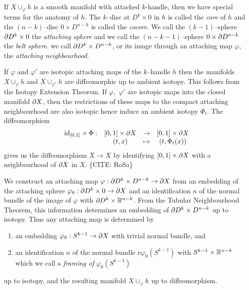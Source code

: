 If $X\cup_\varphi h$ is a smooth manifold with attached $k$-handle, then we have special terms for the anatomy of $h$.
The $k$--disc at $D^k\times 0$ in $h$ is called the \emph{core} of $h$ and the $(n-k)$--disc $0 \times D^{n-k}$ is called the \emph{cocore}.
We call the $(k-1)$--sphere $\partial D^k \times 0$ the \emph{attaching sphere} and we call the $(n-k-1)$--sphere $ 0 \times \partial D^{n-k}$ the \emph{belt sphere}.
we call $\partial D^k\times D^{n-k}$, or its image through an attaching map $\varphi$, the \emph{attaching neighbourhood}.

\begin{rmk}
	If $\varphi$ and $\varphi'$ are isotopic attaching maps of the $k$--handle $h$ then the manifolds $X\cup_\varphi h$ and $X\cup_{\varphi'} h$ are diffeomorphic up to ambient isotopy.
	This follows from the Isotopy Extension Theorem.
	If $\varphi,$ $\varphi'$ are isotopic maps into the closed manifold $\partial X$, then the restrictions of these maps to the compact attaching neighbourhood are also isotopic hence induce an ambient isotopy $\Phi_t$.
	The diffeomorphism
	\[
		\begin{array}{cccc}
			\textrm{id}_{[0,1]}\times\Phi: & [0,1]\times \partial X & \to & [0,1]\times\partial X \\
									 & (t,x) & \mapsto & (t,\Phi_t(x))
		\end{array}
	\]
	gives us the diffeomorphism $X\to X$ by identifying $[0,1]\times\partial X$ with a neighbourhood of $\partial X$ in $X$. \{CITE: RoSa\}
	
	We construct an attaching map $\varphi:\partial D^k\times D^{n-k}\to\partial X$ from an embedding of the attaching sphere $\varphi_0:\partial D^k\times 0\to \partial X$ and an identification $n$ of the normal bundle of the image of $\varphi$ with $\partial D^k \times \mathbb{R}^{n-k}$.
	From the Tubular Neighbourhood Theorem, this information determines an embedding of $\partial D^k\times D^{n-k}$ up to isotopy.
	Thus any attaching map is determined by
	\begin{enumerate}
	  \item an embedding $\varphi_0:S^{k-1}\to\partial X$ with trivial normal bundle, and
	  \item an identification $n$ of the normal bundle $\nu\varphi_0(S^{k-1})$ with $S^{k-1}\times\mathbb{R}^{n-k}$ which we call a \emph{framing of} $\varphi_0(S^{k-1})$
	\end{enumerate}
	up to isotopy, and the resulting manifold $X\cup_\varphi h$ up to diffeomorphism.
\end{rmk}

